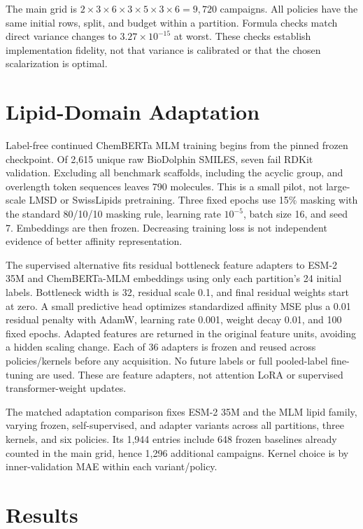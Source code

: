 \documentclass[wcp]{jmlr}
\begin{document}
The main grid is $2\times3\times6\times3\times5\times3\times6=9,720$
campaigns. All policies have the same initial rows, split, and budget within
a partition. Formula checks match direct variance changes to
$3.27\times10^{-15}$ at worst. These checks establish implementation fidelity,
not that variance is calibrated or that the chosen scalarization is optimal.

\section{Lipid-Domain Adaptation}
Label-free continued ChemBERTa MLM training begins from the pinned frozen
checkpoint. Of 2,615 unique raw BioDolphin SMILES, seven fail RDKit validation.
Excluding all benchmark scaffolds, including the acyclic group, and
overlength token sequences leaves 790 molecules. This is a small pilot,
not large-scale LMSD or SwissLipids pretraining. Three fixed epochs use
15\% masking with the standard 80/10/10 masking rule, learning rate
$10^{-5}$, batch size 16, and seed 7. Embeddings are then frozen. Decreasing
training loss is not independent evidence of better affinity representation.

The supervised alternative fits residual bottleneck feature adapters to
ESM-2 35M and ChemBERTa-MLM embeddings using only each partition's 24 initial
labels. Bottleneck width is 32, residual scale 0.1, and final residual weights
start at zero. A small predictive head optimizes standardized affinity MSE
plus a 0.01 residual penalty with AdamW, learning rate 0.001, weight decay
0.01, and 100 fixed epochs. Adapted features are returned in the original
feature units, avoiding a hidden scaling change. Each of 36 adapters is
frozen and reused across policies/kernels before any acquisition. No future
labels or full pooled-label fine-tuning are used. These are feature adapters,
not attention LoRA or supervised transformer-weight updates.

The matched adaptation comparison fixes ESM-2 35M and the MLM lipid family,
varying frozen, self-supervised, and adapter variants across all partitions,
three kernels, and six policies. Its 1,944 entries include 648 frozen
baselines already counted in the main grid, hence 1,296 additional campaigns.
Kernel choice is by inner-validation MAE within each variant/policy.

\section{Results}
\end{document}
